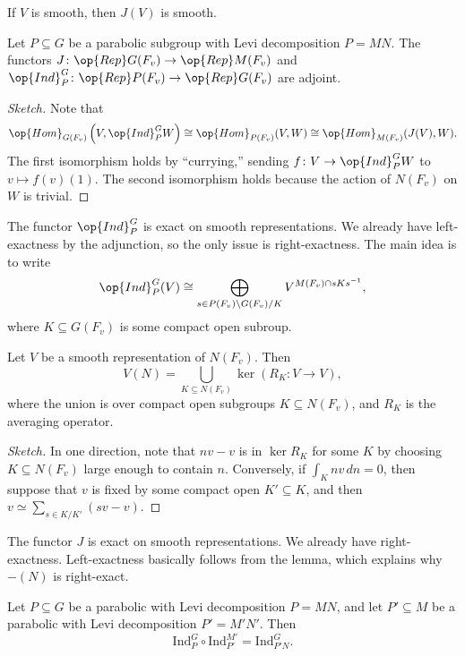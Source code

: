 \documentclass{article}
\begin{document}
\begin{remark}
	If $V$ is smooth, then $J(V)$ is smooth.
\end{remark}
\begin{proposition}
	Let $P\subseteq G$ be a parabolic subgroup with Levi decomposition $P=MN$. The functors $J\colon\op{Rep}G(F_v)\to\op{Rep}M(F_v)$ and $\op{Ind}_P^G\colon\op{Rep}P(F_v)\to\op{Rep}G(F_v)$ are adjoint.
\end{proposition}
\begin{proof}[Sketch]
	Note that
	\[\op{Hom}_{G(F_v)}\left(V,\op{Ind}_P^GW\right)\cong\op{Hom}_{P(F_v)}(V,W)\cong\op{Hom}_{M(F_v)}(J(V),W).\]
	The first isomorphism holds by ``currying,'' sending $f\colon V\to\op{Ind}_P^GW$ to $v\mapsto f(v)(1)$. The second isomorphism holds because the action of $N(F_v)$ on $W$ is trivial.
\end{proof}
\begin{remark}
	The functor $\op{Ind}_P^G$ is exact on smooth representations. We already have left-exactness by the adjunction, so the only issue is right-exactness. The main idea is to write
	\[\op{Ind}_P^G(V)\cong\bigoplus_{s\in P(F_v)\backslash G(F_v)/K}V^{M(F_v)\cap sKs^{-1}},\]
	where $K\subseteq G(F_v)$ is some compact open subroup.
\end{remark}
\begin{lemma}
	Let $V$ be a smooth representation of $N(F_v)$. Then
	\[V(N)=\bigcup_{K\subseteq N(F_v)}\ker(R_K\colon V\to V),\]
	where the union is over compact open subgroups $K\subseteq N(F_v)$, and $R_K$ is the averaging operator.
\end{lemma}
\begin{proof}[Sketch]
	In one direction, note that $nv-v$ is in $\ker R_K$ for some $K$ by choosing $K\subseteq N(F_v)$ large enough to contain $n$. Conversely, if $\int_Knv\,dn=0$, then suppose that $v$ is fixed by some compact open $K'\subseteq K$, and then $v\simeq\sum_{s\in K/K'}(sv-v)$.
\end{proof}
\begin{remark}
	The functor $J$ is exact on smooth representations. We already have right-exactness. Left-exactness basically follows from the lemma, which explains why $-(N)$ is right-exact.
\end{remark}
\begin{lemma}[transitivity]
	Let $P\subseteq G$ be a parabolic with Levi decomposition $P=MN$, and let $P'\subseteq M$ be a parabolic with Levi decomposition $P'=M'N'$. Then
	\[\mathrm{Ind}_P^G\circ\mathrm{Ind}_{P'}^{M'}=\mathrm{Ind}_{P'N}^G.\]
\end{lemma}
\end{document}
